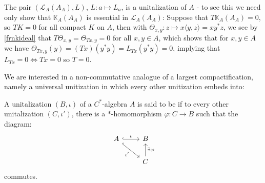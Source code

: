 \begin{example}
	The pair $(\mathcal{L}_A(A_A),L)$, $L\colon a \mapsto L_a$, is a unitalization of $A$ - to see this we need only show that $\mathbb{K}_A(A_A)$ is essential in $\mathcal{L}_A(A_A)$: Suppose that $T \mathbb{K}_A(A_A)=0$, so $TK = 0$ for all compact $K$ on $A$, then with $\Theta_{x,y} \colon z \mapsto x\langle y,z\rangle = xy^*z$, we see by \ref{frnkideal} that $T \Theta_{x,y}=\Theta_{Tx,y}= 0$ for all $x, y \in A$, which shows that for $x,y \in A$ we have $\Theta_{Tx,y}(y) = (Tx)(y^*y)=L_{Tx}(y^*y)=0$, implying that $L_{Tx}=0 \iff Tx = 0$ so $T=0$. 
	\label{mult:compess}
\end{example}
We are interested in a non-commutative analogue of a largest compactification, namely a universal unitization in which every other unitization embeds into:
\begin{definition}
	A unitalization $(B, \iota)$ of a $C^*$-algebra $A$ is said to be  if to every other unitalization $(C,\iota')$, there is a $*$-homomorphism $\varphi \colon C \to B$ such that the diagram:
	\begin{equation}
	\begin{tikzcd}
		A\arrow[dr,"\iota'"', hook] \arrow[r, "\iota", hook] & B \\
		& C \arrow[u, "\exists \varphi"']
	\end{tikzcd}
	\end{equation}
	commutes.
	\label{mult:defmaxun}
\end{definition}

